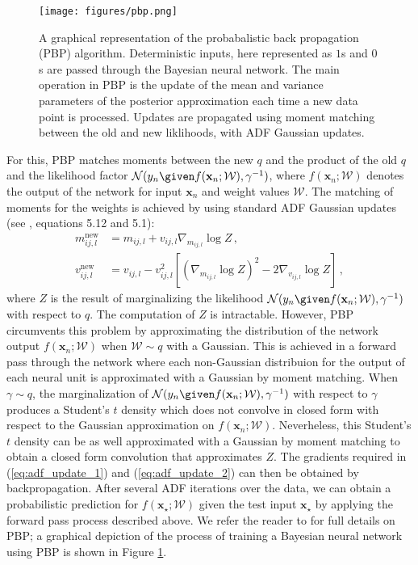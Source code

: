 \begin{figure}[hb]
\centering
\texttt{[image: figures/pbp.png]}

\caption{A graphical representation of the probabalistic back propagation (PBP) algorithm. Deterministic inputs, here represented as $1$s and $0$s are passed through the Bayesian neural network. The main operation in PBP is the update of the mean and variance parameters of the posterior approximation each time a new data point is processed. Updates are propagated using moment matching between the old and new liklihoods, with ADF Gaussian updates.}
\label{fig:pbp}
\end{figure} 
For this, PBP matches moments between
the new $q$ and the product of the old $q$ and the likelihood factor
$\mathcal{N}(y_n\given f(\mathbf{x}_n;\mathcal{W}),\gamma^{-1})$,
where $f(\mathbf{x}_n;\mathcal{W})$ denotes the output of the network for input $\mathbf{x}_n$ and weight values $\mathcal{W}$.
The matching of moments for the weights is achieved by using standard ADF Gaussian updates (see
\cite{minka2001family}, equations 5.12 and 5.1):
\begin{align}
m_{ij,l}^\text{new} & = m_{ij,l} + v_{ij,l} \nabla_{m_{ij,l}} \log Z \,,\label{eq:adf_update_1}\\
v_{ij,l}^\text{new} & = v_{ij,l} - v_{ij,l}^2 \left[ (\nabla_{m_{ij,l}} \log Z)^2 - 2 \nabla_{v_{ij,l}} \log Z \right]\,,\label{eq:adf_update_2}
\end{align}
where $Z$ is the result of marginalizing the likelihood $\mathcal{N}(y_n\given f(\mathbf{x}_n;\mathcal{W}),\gamma^{-1})$ with
respect to $q$. The computation of $Z$ is intractable. However, PBP circumvents this problem by
approximating the distribution of the network output $f(\mathbf{x}_n;\mathcal{W})$ when $\mathcal{W} \sim q$ with a Gaussian. 
This is achieved in a forward pass through the network where each non-Gaussian distribuion
for the output of each neural unit is approximated with a Gaussian by moment matching.
When $\gamma\sim q$, the marginalization of $\mathcal{N}(y_n\given f(\mathbf{x}_n;\mathcal{W}),\gamma^{-1})$ 
with respect to $\gamma$ produces a Student's $t$ density which does not
convolve in closed form with respect to the Gaussian approximation on $f(\mathbf{x}_n;\mathcal{W})$. Neverheless, this Student's
$t$ density can be as well approximated with a Gaussian by moment matching to obtain a closed form convolution that approximates $Z$.
The gradients required in (\ref{eq:adf_update_1}) and (\ref{eq:adf_update_2}) can then be obtained by backpropagation.
After several ADF iterations over the data,  we can obtain a probabilistic
prediction for $f(\mathbf{x}_\star;\mathcal{W})$ given the test input
$\mathbf{x}_\star$ by applying the forward pass process described above.  We
refer the reader to \cite{hernandez2015probabilistic} for full details on PBP; a graphical depiction of the process of training a Bayesian neural network using PBP is shown in Figure \ref{fig:pbp}.

